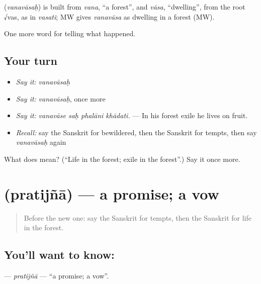 \begin{cousinweb}
\textbf{} (\emph{vanavāsaḥ}) is built from \emph{vana}, \textquotedblleft{}a forest\textquotedblright{}, and \emph{vāsa}, \textquotedblleft{}dwelling\textquotedblright{}, from the root √vas, as in \emph{vasati}; MW gives \emph{vanavāsa} as dwelling in a forest (MW).
\end{cousinweb}

\begin{grammarlens}[title={What you've built}]
One more word for telling what happened.
\end{grammarlens}

\subsection*{Your turn}
\begin{itemize}
\raggedright
  \item \emph{Say it:} \emph{vanavāsaḥ}
  \item \emph{Say it:} \emph{vanavāsaḥ}, once more
  \item \emph{Say it:} \emph{vanavāse saḥ phalāni khādati.} — In his forest exile he lives on fruit.
  \item \emph{Recall:} say the Sanskrit for bewildered, then the Sanskrit for tempts, then say \emph{vanavāsaḥ} again
\end{itemize}

\begin{tcolorbox}[breakable,colback=teal!4,colframe=teal!35!black,title={Before you move on}]
What does  mean? (\textquotedblleft{}Life in the forest; exile in the forest\textquotedblright{}.) Say it once more.
\end{tcolorbox}
\section[\texorpdfstring{\sk{प्रतिज्ञा} (pratijñā)}{प्रतिज्ञा (pratijñā)}]{ (pratijñā) — a promise; a vow}

\label{lesson:SA-C337-pratijna}



\begin{quote}
Before the new one: say the Sanskrit for tempts, then the Sanskrit for life in the forest.
\end{quote}

\subsection*{You'll want to know: }
\textbf{} — \emph{pratijñā} — \textquotedblleft{}a promise; a vow\textquotedblright{}.

